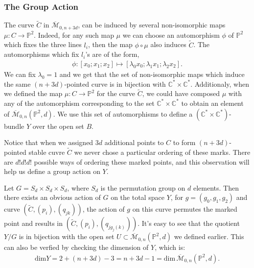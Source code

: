 \subsubsection{The Group Action}
\par The curve $\tilde C$ in $\overline{\mathcal{M}}_{0,n+3d}$, can be induced by several non-isomorphic maps $\mu : C \to \mathbb{P}^{2}$.
Indeed, for any such map $\mu$ we can choose an automorphism $\phi$ of $\mathbb{P}^{2}$ which fixes the three lines $l_{i}$, then the map $\phi \circ \mu$ also induces $\tilde C$.
The automorphisms which fix $l_{i}$'s are of the form,
\begin{align*}
    \phi: [x_{0};x_{1};x_{2}] \mapsto [\lambda_{0}x_{0};\lambda_{1}x_{1};\lambda_{2}x_{2}].
\end{align*}
We can fix $\lambda_{0} = 1$ and we get that the set of non-isomorphic maps which induce the same $(n+3d)$-pointed curve is in bijection with $\mathbb{C}^{*}\times \mathbb{C}^{*}$.
Additionaly, when we defined the map $\mu: C \to \mathbb{P}^{2}$ for the curve $\tilde C$, we could have composed $\mu$ with any of the automorphism corresponding to the set $\mathbb{C}^{*}\times \mathbb{C}^{*}$ to obtain an element of $\overline{\mathcal{M}}_{0,n}(\mathbb{P}^{2},d)$.
We use this set of automorphisms to define a $(\mathbb{C}^{*}\times \mathbb{C}^{*})$-bundle $Y$ over the open set $B$.

\par Notice that when we assigned $3d$ additional points to $C$ to form $(n+3d)$-pointed stable cuvre $\tilde C$ we never chose a particular ordering of these marks.
There are $d!d!d!$ possible ways of ordering these marked points, and this observation will help us define a group action on $Y$.

\par Let $G = S_{d} \times S_{d} \times S_{d}$, where $S_{d}$ is the permutation group on $d$ elements.
Then there exists an obvious action of $G$ on the total space $Y$, for $g = (g_{0},g_{1},g_{2})$ and curve $(\tilde C,(p_{i}),(q_{jk}))$, the action of $g$ on this curve permutes the marked point and results in $(\tilde C,(p_{i}),(q_{jg_{j}(k)}))$.
It's easy to see that the quotient $Y/G$ is in bijection with the open set $U \subset \overline{\mathcal{M}}_{0,n}(\mathbb{P}^{2},d)$ we defined earlier. 
This can also be verfied by checking the dimension of $Y$, which is:
\begin{align*}
    \text{dim}Y = 2 + (n+3d)-3 = n + 3d - 1 = \text{dim}\,\overline{\mathcal{M}}_{0,n}(\mathbb{P}^{2},d).
\end{align*}

